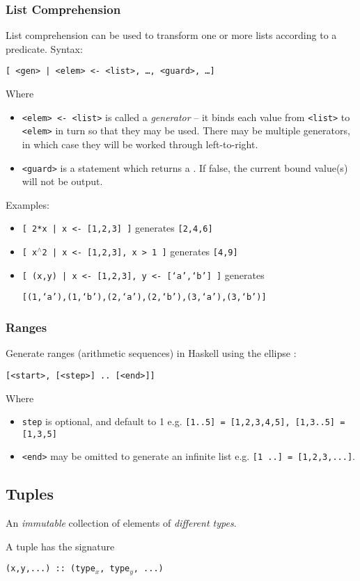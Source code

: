 \subsubsection{List Comprehension}
List comprehension can be used to transform one or more lists according to a predicate. Syntax:
\begin{center}
  \texttt{[ <gen> | <elem> <- <list>, \ldots, <guard>, \ldots ]}
\end{center}

Where
\begin{itemize}
  \item \texttt{<elem> <- <list>} is called a \textit{generator} -- it binds each value from \texttt{<list>} to \texttt{<elem>} in turn so that they may be used. There may be multiple generators, in which case they will be worked through left-to-right.
  \item \texttt{<guard>} is a statement which returns a \texttt{}. If false, the current bound value(s) will not be output.
\end{itemize}

Examples:
\begin{itemize}
  \item \texttt{[ 2*x | x <- [1,2,3] ]} generates \texttt{[2,4,6]}
  \item \texttt{[ x$^{\land}$2 | x <- [1,2,3], x > 1 ]} generates \texttt{[4,9]}
  \item \texttt{[ (x,y) | x <- [1,2,3], y <- [`a',`b'] ]} generates
  
  \texttt{[(1,`a'),(1,`b'),(2,`a'),(2,`b'),(3,`a'),(3,`b')]}
\end{itemize}


\subsubsection{Ranges}
Generate ranges (arithmetic sequences) in Haskell using the ellipse :
\begin{center}
  \texttt{[<start>, [<step>] .. [<end>]]}
\end{center}
Where
\begin{itemize}
  \item \texttt{step} is optional, and default to 1 e.g. \texttt{[1..5] = [1,2,3,4,5], [1,3..5] = [1,3,5]}
  \item \texttt{<end>} may be omitted to generate an infinite list e.g. \texttt{[1 ..] = [1,2,3,...]}.
\end{itemize}


\subsection{Tuples}
An \textit{immutable} collection of elements of \textit{different types}.

A tuple has the signature
\begin{center}
  \texttt{(x,y,...) :: (type$_x$, type$_y$, ...)}
\end{center}